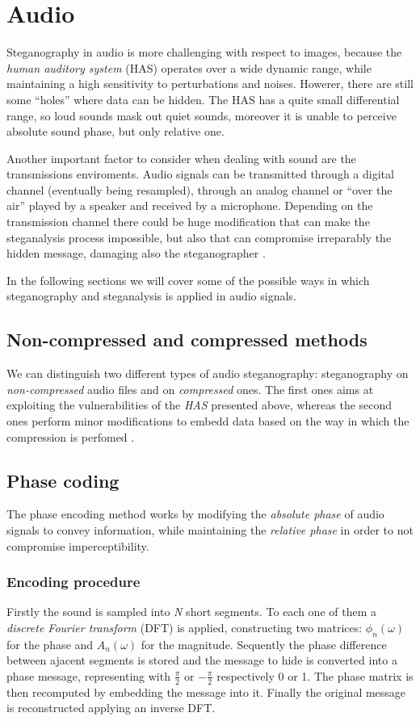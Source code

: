 \documentclass[../../main.tex]{subfiles}
\begin{document}
    

\section{Audio}
Steganography in audio is more challenging with respect to images, because
the \emph{human auditory system} (HAS) operates over a wide dynamic range,
while maintaining a high sensitivity to perturbations and noises.
Howerer, there are still some ``holes'' where data can be hidden.
The HAS has a quite small differential range, so loud sounds mask out quiet
sounds, moreover it is unable to perceive absolute sound phase, but only
relative one.

Another important factor to consider when dealing with sound are the
transmissions enviroments.
Audio signals can be transmitted through a digital channel (eventually being
resampled), through an analog channel or ``over the air'' played by a
speaker and received by a microphone.
Depending on the transmission channel there could be huge modification that
can make the steganalysis process impossible, but also that can compromise
irreparably the hidden message, damaging also the steganographer
\cite{techniques-data-hiding}.

In the following sections we will cover some of the possible ways in which
steganography and steganalysis is applied in audio signals.

\subsection{Non-compressed and compressed methods}
We can distinguish two different types of audio steganography: steganography
on \emph{non-compressed} audio files and on \emph{compressed} ones.
The first ones aims at exploiting the vulnerabilities of the \emph{HAS}
presented above, whereas the second ones perform minor modifications to
embedd data based on the way in which the compression is perfomed
\cite{review-audio-steganalysis}.

\subsection{Phase coding}
The phase encoding method works by modifying the \emph{absolute phase} of
audio signals to convey information, while maintaining the \emph{relative
phase} in order to not compromise imperceptibility.

\subsubsection{Encoding procedure}
Firstly the sound is sampled into \emph{N} short segments. To each one of them 
a \emph{discrete Fourier transform} (DFT) is applied, constructing two matrices: $\phi_n(\omega)$ for the phase 
and  $A_n(\omega)$ for the magnitude. Sequently the phase difference between ajacent segments is stored and the message to hide 
is converted into a phase message, representing with $\frac{\pi}{2}$ or $-\frac{\pi}{2}$ respectively 0 or 1.
The phase matrix is then recomputed by embedding the message into it. Finally the original message is reconstructed applying an inverse DFT.
\end{document}
